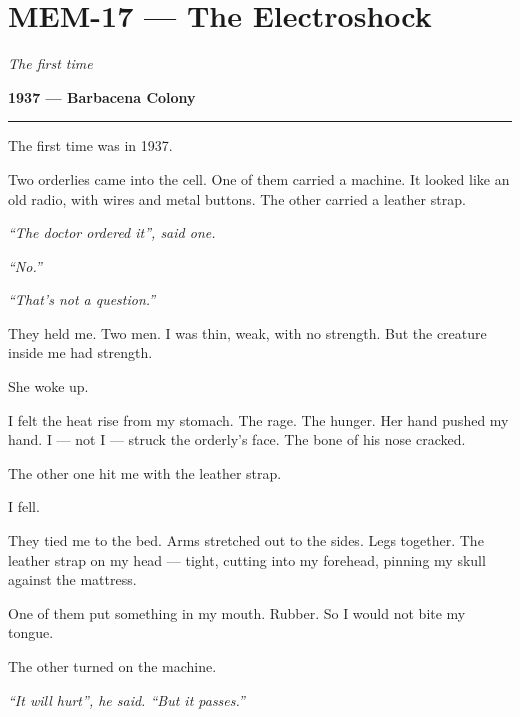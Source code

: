 \section*{\textbf{MEM-17} --- The Electroshock}

\noindent \textit{The first time}

\noindent \textbf{1937 --- Barbacena Colony}

\vspace{0.5em}\noindent\rule{\textwidth}{0.5pt}\vspace{0.5em}

\noindent The first time was in 1937.

\noindent Two orderlies came into the cell. One of them carried a machine. It looked like an old radio, with wires and metal buttons. The other carried a leather strap.

\noindent \textit{\textquotedblleft{}The doctor ordered it\textquotedblright{}, said one.}

\noindent \textit{\textquotedblleft{}No.\textquotedblright{}}

\noindent \textit{\textquotedblleft{}That's not a question.\textquotedblright{}}

\noindent They held me. Two men. I was thin, weak, with no strength. But the creature inside me had strength.

\noindent She woke up.

\noindent I felt the heat rise from my stomach. The rage. The hunger. Her hand pushed my hand. I --- not I --- struck the orderly's face. The bone of his nose cracked.

\noindent The other one hit me with the leather strap.

\noindent I fell.

\noindent They tied me to the bed. Arms stretched out to the sides. Legs together. The leather strap on my head --- tight, cutting into my forehead, pinning my skull against the mattress.

\noindent One of them put something in my mouth. Rubber. So I would not bite my tongue.

\noindent The other turned on the machine.

\noindent \textit{\textquotedblleft{}It will hurt\textquotedblright{}\textit{, he said. }\textquotedblleft{}But it passes.\textquotedblright{}}


